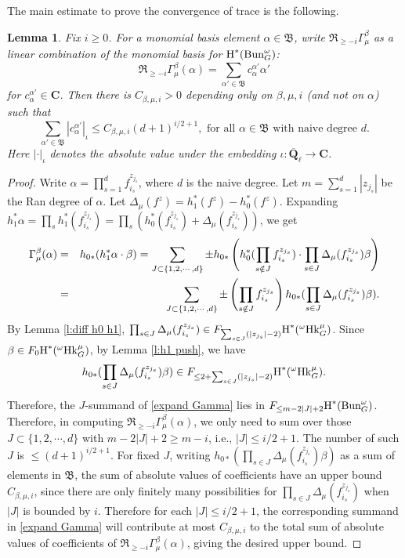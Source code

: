 \documentclass[reqno]{amsart}
\numberwithin{equation}{subsection}
\newtheorem{lemma}[subsubsection]{Lemma}
\theoremstyle{definition}
\def\CC{\mathbf{C}}
\newcommand\frB{\mathfrak{B}}
\newcommand\frR{\mathfrak{R}}
\newcommand{\Bun}{\textup{Bun}}
\newcommand\Hk{\mathrm{Hk}}
\newcommand{\Qlbar}{\overline{\Q}_\ell}
\newcommand{\cohog}[2]{\textup{H}^{#1}({#2})}     %
\renewcommand\a\alpha
\renewcommand\b\beta
\newcommand\G\Gamma
\newcommand\D\Delta
\newcommand{\io}{\iota}
\newcommand{\om}{\omega}
\newcommand{\Q}{\mathbf{Q}}
\begin{document}
The main estimate to prove the convergence of trace is the following.
\begin{lemma}\label{l:bound trunc Gamma}
Fix $i\ge0$. For a monomial basis element $\a\in \frB$, write $\frR_{\ge -i}\G^\b_\mu$ as a linear combination of the monomial basis for $\cohog{*}{\Bun_G^{\om}}$:
\begin{equation*}
\frR_{\ge -i}\G^\b_\mu(\a)=\sum_{\a'\in \frB}c^{\a'}_{\a}\a'
\end{equation*}
for $c^{\a'}_{\a}\in\CC$. Then there is $C_{\b,\mu,i}>0$ depending only on $\b,\mu,i$ (and not on $\a$) such that
\begin{equation*}
\sum_{\a'\in \frB}|c^{\a'}_{\a}|_{\io}\le C_{\b,\mu,i}(d+1)^{i/2+1}, \mbox{ for all $\a\in \frB$ with naive degree $d$}. 
\end{equation*}
Here $|\cdot|_{\io}$ denotes the absolute value under the embedding $\io:\Qlbar\to \CC$.
\end{lemma}
\begin{proof}
Write $\a=\prod_{s=1}^{d}f_{i_s}^{z_{j_s}}$, where $d$ is the naive degree. Let $m=\sum_{s=1}^{d}|z_{j_s}|$ be the Ran degree of $\a$. Let $\D_\mu(f^z)=h_1^*(f^z)-h_0^*(f^z)$. Expanding $h_1^*\a=\prod_{s}h_1^*(f_{i_s}^{z_{j_s}})=\prod_s(h_0^*(f_{i_s}^{z_{j_s}})+\D_\mu(f_{i_s}^{z_{j_s}}))$, we get
\begin{eqnarray}
\notag
\G^\b_\mu(\a)&=&h_{0*}(h_1^*\a \cdot \b)=\sum_{J\subset \{1,2,\cdots, d\}}\pm h_{0*}\left(h_0^*(\prod_{s\notin J}f_{i_s}^{z_{j_s}})\cdot \prod_{s\in J}\D_\mu(f_{i_s}^{z_{j_s}})\b\right)\\
\label{expand Gamma}&=&\sum_{J\subset \{1,2,\cdots, d\}}\pm \left(\prod_{s\notin J}f_{i_s}^{z_{j_s}}\right)h_{0*}(\prod_{s\in J}\D_\mu(f_{i_s}^{z_{j_s}})\b).
\end{eqnarray}
By Lemma \ref{l:diff h0 h1}, $\prod_{s\in J}\D_\mu(f_{i_s}^{z_{j_s}})\in F_{\sum_{s\in J}(|z_{j_s}|-2)}\cohog{*}{{}^\om\Hk^\mu_G}$. Since $\b\in F_{0}\cohog{*}{{}^\om\Hk^\mu_G}$, by Lemma \ref{l:h1 push}, we have
\begin{equation*}
h_{0*}(\prod_{s\in J}\D_\mu(f_{i_s}^{z_{j_s}})\b)\in F_{\le 2+\sum_{s\in J}(|z_{j_s}|-2)}\cohog{*}{{}^\om\Hk^\mu_G}.
\end{equation*}
Therefore, the $J$-summand of \eqref{expand Gamma} lies in $F_{\le m-2|J|+2}\cohog{*}{\Bun_G^{\om}}$. Therefore, in computing $\frR_{\ge -i}\G^\b_\mu(\a)$, we only need to sum over those $J\subset \{1,2,\cdots, d\}$ with $m-2|J|+2\ge m-i$, i.e., $|J|\le i/2+1$. The number of such $J$ is $\le (d+1)^{i/2+1}$. For fixed $J$, writing  $h_{0*}(\prod_{s\in J}\D_\mu(f_{i_s}^{z_{j_s}})\b)$ as a sum of elements in $\frB$, the sum of absolute values of coefficients have an upper bound $C_{\b,\mu,i}$, since there are only finitely many possibilities for $\prod_{s\in J}\D_\mu(f_{i_s}^{z_{j_s}})$ when $|J|$ is bounded by $i$. Therefore for each $|J|\le i/2+1$, the corresponding summand in \eqref{expand Gamma} will contribute at most $C_{\b,\mu,i}$ to the total sum of absolute values of coefficients of $\frR_{\ge -i}\G^\b_\mu(\a)$, giving the desired upper bound.
\end{proof}
\end{document}
